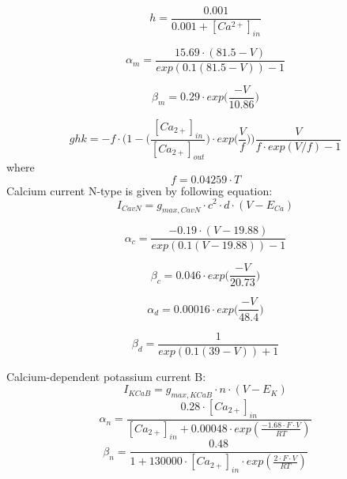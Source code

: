 \documentclass[12pt]{article}
\begin{document}
\begin{equation}
h = \frac{0.001}{0.001 +[Ca^{2+}]_{in} }
\end{equation}

\begin{equation}
\alpha_{m} = \frac{15.69 \cdot (81.5-V)}{exp(0.1(81.5-V)) - 1}
\end{equation}

\begin{equation}
\beta_{m} = 0.29 \cdot exp \Big(\frac{-V}{10.86}\Big)
\end{equation}

\begin{equation}
ghk = -f \cdot \Big(1 - \Big(\frac{[Ca_{2+}]_{in}}{[Ca_{2+}]_{out}} \Big) \cdot exp \Big(\frac{V}{f}\Big) \Big) \frac{V}{f \cdot exp(V/f) -1 }
\end{equation}
where
\begin{equation}
f = 0.04259 \cdot T
\end{equation}
Calcium current N-type is given by following equation: 
\begin{equation}
\label{eq:CavN}
I_{CavN} = g_{max, CavN} \cdot c^2 \cdot d \cdot (V - E_{Ca})
\end{equation}

\begin{equation}
\alpha_{c} = \frac{-0.19 \cdot (V - 19.88)}{exp(0.1(V - 19.88)) - 1}
\end{equation}

\begin{equation}
\beta_{c} = 0.046 \cdot exp \Big(\frac{-V}{20.73}\Big)
\end{equation}

\begin{equation}
\alpha_{d} = 0.00016 \cdot exp \Big(\frac{-V}{48.4}\Big)
\end{equation}

\begin{equation}
\beta_{d} = \frac{1}{exp(0.1(39 - V)) + 1}
\end{equation}


Calcium-dependent potassium current B:
\begin{equation}
I_{KCaB} = g_{max, KCaB} \cdot n \cdot (V - E_K)
\label{eq:KvCaB}
\end{equation}
\begin{equation}
\alpha_n = \frac{0.28 \cdot [Ca_{2+}]_{in} }{ [Ca_{2+}]_{in} + 0.00048 \cdot exp(\frac{-1.68 \cdot F \cdot V}{RT})  } 
\end{equation}
\begin{equation}
\beta_n = \frac{0.48}{1 + 130000 \cdot [Ca_{2+}]_{in} \cdot exp(\frac{2 \cdot F \cdot V}{RT})}
\end{equation}
\end{document}
